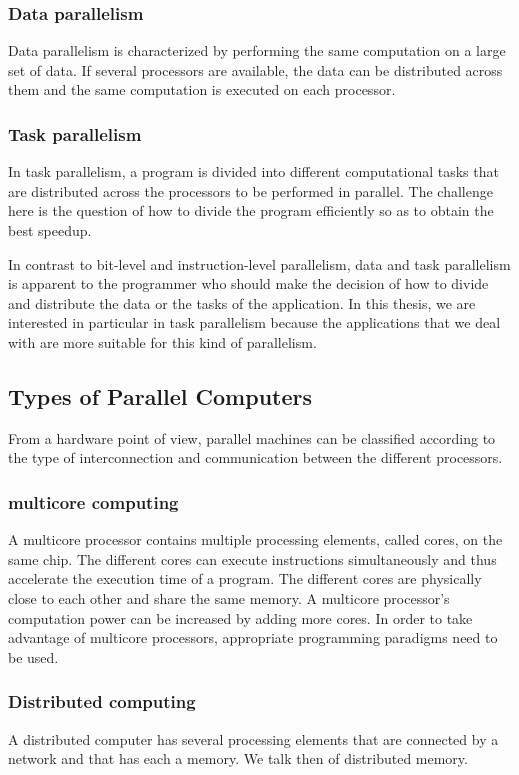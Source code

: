 \subsubsection{Data parallelism}
Data parallelism is characterized by performing the same computation on a large set of data. If several processors are available, the data can be distributed across them and the same computation is executed on each processor.  

\subsubsection{Task parallelism}
In task parallelism, a program is divided into different computational tasks that are distributed across the processors to be performed in parallel. The challenge here is the question of how to divide the program efficiently so as to obtain the best speedup.

In contrast to bit-level and instruction-level parallelism, data and task parallelism is apparent to the programmer who should make the decision of how to divide and distribute the data or the tasks of the application. In this thesis, we are interested in particular in task parallelism because the applications that we deal with are more suitable for this kind of parallelism.

\subsection{Types of Parallel Computers}

From a hardware point of view, parallel machines can be classified according to the type of interconnection and communication between the different processors.

\subsubsection{multicore computing}
A multicore processor contains multiple processing elements, called cores, on the same chip. The different cores can execute instructions simultaneously and thus accelerate the execution time of a program. The different cores are physically close to each other and share the same memory. A multicore processor's computation power can be increased by adding more cores. In order to take advantage of multicore processors, appropriate programming paradigms need to be used.  

\subsubsection{Distributed computing}
A distributed computer has several processing elements that are connected by a network and that has each a memory. We talk then of distributed memory.

